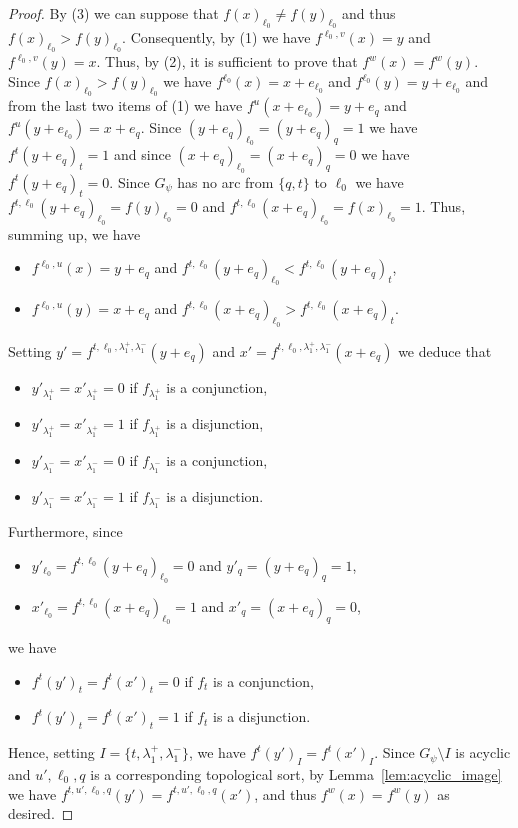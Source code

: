 \documentclass[11pt,letter]{article}
\begin{document}
\begin{proof}
\bigskip
By (3) we can suppose that $f(x)_{\ell_0}\neq f(y)_{\ell_0}$ and thus $f(x)_{\ell_0}> f(y)_{\ell_0}$. Consequently, by (1) we have $f^{\ell_0,v}(x)=y$ and $f^{\ell_0,v}(y)=x$. Thus, by (2), it is sufficient to prove that $f^w(x)=f^w(y)$. Since $f(x)_{\ell_0}> f(y)_{\ell_0}$ we have $f^{\ell_0}(x)=x+e_{\ell_0}$ and $f^{\ell_0}(y)=y+e_{\ell_0}$ and from the last two items of (1) we have $f^u(x+e_{\ell_0})=y+e_q$ and $f^u(y+e_{\ell_0})=x+e_q$. Since $(y+e_q)_{\ell_0}=(y+e_q)_q=1$ we have $f^t(y+e_q)_t=1$ and since $(x+e_q)_{\ell_0}=(x+e_q)_q=0$ we have $f^t(y+e_q)_t=0$. Since $G_\psi$ has no arc from $\{q,t\}$ to $\ell_0$ we have $f^{t,\ell_0}(y+e_q)_{\ell_0}=f(y)_{\ell_0}=0$ and $f^{t,\ell_0}(x+e_q)_{\ell_0}=f(x)_{\ell_0}=1$. Thus, summing up, we have 
\begin{itemize}
\item 
$f^{\ell_0,u}(x)=y+e_q$ and $f^{t,\ell_0}(y+e_q)_{\ell_0}< f^{t,\ell_0}(y+e_q)_t$,
\item
$f^{\ell_0,u}(y)=x+e_q$ and $f^{t,\ell_0}(x+e_q)_{\ell_0}> f^{t,\ell_0}(x+e_q)_t$.
\end{itemize} 
Setting $y'=f^{t,\ell_0,\lambda^+_1,\lambda^-_1}(y+e_q)$ and $x'=f^{t,\ell_0,\lambda^+_1,\lambda^-_1}(x+e_q)$ we deduce that 
\begin{itemize}
\item
$y'_{\lambda^+_1}=x'_{\lambda^+_1}=0$ if $f_{\lambda^+_1}$ is a conjunction,
\item
$y'_{\lambda^+_1}=x'_{\lambda^+_1}=1$ if $f_{\lambda^+_1}$ is a disjunction,
\item
$y'_{\lambda^-_1}=x'_{\lambda^-_1}=0$ if $f_{\lambda^-_1}$ is a conjunction,
\item
$y'_{\lambda^-_1}=x'_{\lambda^-_1}=1$ if $f_{\lambda^-_1}$ is a disjunction.
\end{itemize} 
Furthermore, since 
\begin{itemize}
\item
$y'_{\ell_0}=f^{t,\ell_0}(y+e_q)_{\ell_0}=0$ and $y'_q=(y+e_q)_q=1$,
\item
$x'_{\ell_0}=f^{t,\ell_0}(x+e_q)_{\ell_0}=1$ and $x'_q=(x+e_q)_q=0$, 
\end{itemize}
we have 
\begin{itemize}
\item
$f^t(y')_t=f^t(x')_t=0$ if $f_t$ is a conjunction,
\item
$f^t(y')_t=f^t(x')_t=1$ if $f_t$ is a disjunction.
\end{itemize}
Hence, setting $I=\{t,\lambda^+_1,\lambda^-_1\}$, we have $f^t(y')_I=f^t(x')_I$. Since $G_\psi\setminus I$ is acyclic and $u',\ell_0,q$ is a corresponding topological sort, by Lemma~\ref{lem:acyclic_image} we have $f^{t,u',\ell_0,q}(y')=f^{t,u',\ell_0,q}(x')$, and thus $f^w(x)=f^w(y)$ as desired. 


\end{proof}
\end{document}
